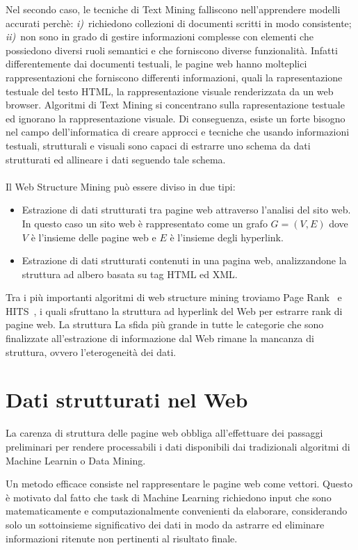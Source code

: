 Nel secondo caso, le tecniche di Text Mining falliscono nell'apprendere modelli accurati perchè: \textit{i)}~richiedono collezioni di documenti scritti in modo consistente; \textit{ii)}~non sono in grado di gestire informazioni complesse con elementi che possiedono diversi ruoli semantici e che forniscono diverse funzionalità. Infatti differentemente dai documenti testuali, le pagine web hanno molteplici rappresentazioni che forniscono differenti informazioni, quali la rapresentazione testuale del testo HTML, la rappresentazione visuale renderizzata da un web browser. Algoritmi di Text Mining si concentrano sulla rapresentazione testuale ed ignorano la rappresentazione visuale. Di conseguenza, esiste un forte bisogno nel campo dell’informatica di creare approcci e tecniche che usando informazioni testuali, strutturali e visuali sono capaci di estrarre uno schema da dati strutturati ed allineare i dati seguendo tale schema.
\\\\
Il Web Structure Mining può essere diviso in due tipi:
\begin{itemize}
\item Estrazione di dati strutturati tra pagine web attraverso l'analisi del sito web. In questo caso un sito web è rappresentato come un grafo $G = (V, E)$ dove $V$ è l'insieme delle pagine web e $E$ è l'insieme degli hyperlink.

\item Estrazione di dati strutturati contenuti in una pagina web, analizzandone la struttura ad albero basata su tag HTML ed XML.
\end{itemize}
Tra i più importanti algoritmi di web structure mining troviamo Page Rank~\cite{pagerank} e HITS~\cite{Kleinberg99}, i quali sfruttano la struttura ad hyperlink del Web per estrarre rank di pagine web.
\color{red}
La struttura 
La sfida più grande in tutte le categorie che sono finalizzate all'estrazione di informazione dal Web rimane la mancanza di struttura, ovvero l'eterogeneità dei dati. 
\color{black}
\section{Dati strutturati nel Web}
La carenza di struttura delle pagine web obbliga all'effettuare dei passaggi preliminari per rendere processabili i dati disponibili dai tradizionali algoritmi di Machine Learnin o Data Mining.

Un metodo efficace consiste nel rappresentare le pagine web come vettori. Questo è motivato dal fatto che task di Machine Learning richiedono input che sono matematicamente e computazionalmente convenienti da elaborare, considerando solo un sottoinsieme significativo dei dati in modo da astrarre ed eliminare informazioni ritenute non pertinenti al risultato finale. 

